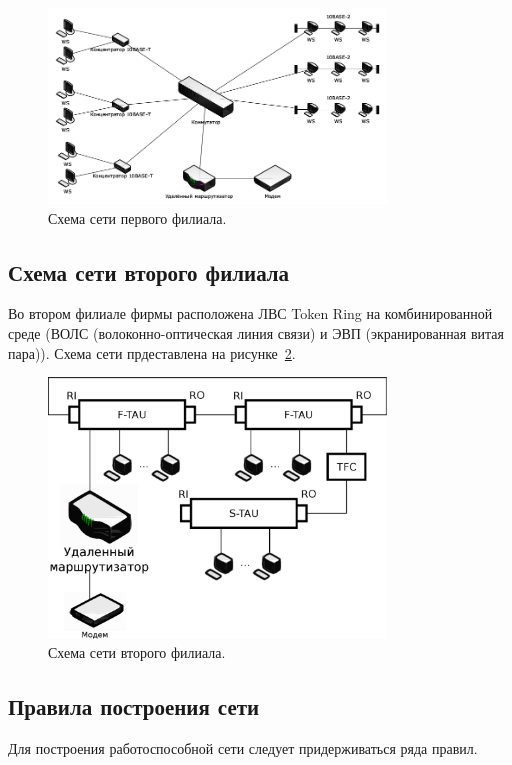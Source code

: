 \documentclass[russian,utf8,emptystyle]{eskdtext}
\begin{document}
\begin{figure}[h!]
\centering
\includegraphics[width=0.8\textwidth]{filial_ofice_1}
\caption{Схема сети первого филиала.}
\label{fig:filial-ofice-1}
\end{figure}


\clearpage
\subsection{Схема сети второго филиала}
Во втором филиале фирмы расположена ЛВС Token Ring на комбинированной среде (ВОЛС (волоконно-оптическая линия связи) и ЭВП (экранированная витая пара)). Схема сети прдеставлена на рисунке~\ref{fig:filial-ofice-2}.

\begin{figure}[h!]
\centering
\includegraphics[width=0.8\textwidth]{filial_ofice_2}
\caption{Схема сети второго филиала.}
\label{fig:filial-ofice-2}
\end{figure}

\clearpage
\subsection{Правила построения сети}
Для построения работоспособной сети следует придерживаться ряда правил.
\end{document}
